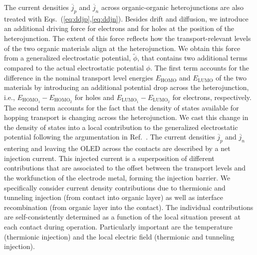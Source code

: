 \documentclass[%
9pt,
 aip,
rsi,%
 amsmath,amssymb,
preprint,%
]{revtex4-1}
\begin{document}
The current densities $\overline{j}_p$ and $\overline{j}_n$ across organic-organic heterojunctions are also treated with Eqs.~(\ref{eq:ddjp},\ref{eq:ddjn}).
%
Besides drift and diffusion, we introduce an additional driving force for electrons and for holes at the position of the heterojunction. 
The extent of this force reflects how the transport-relevant levels of the two organic materials align at the heterojunction.
We obtain this force from a generalized electrostatic potential, $\tilde{\phi}$, that contains two additional terms compared to the actual electrostatic potential $\phi$. 
The first term accounts for the difference in the nominal transport level energies $E_{\mathrm{HOMO}}$ and $E_{\mathrm{LUMO}}$ of the two materials by introducing an additional potential drop across the heterojunction, i.e., $E_{\mathrm{HOMO}_1}-E_{\mathrm{HOMO}_2}$ for holes and $E_{\mathrm{LUMO}_1}-E_{\mathrm{LUMO}_2}$ for electrons, respectively. \cite{Sutherland}
The second term accounts for the fact that the density of states available for hopping transport is changing across the heterojunction.
We cast this change in the density of states into a local contribution to the generalized electrostatic potential following the argumentation in Ref.~\cite{Liemant}.
The current densities $\overline{j}_p$ and $\overline{j}_n$ entering and leaving the OLED across the contacts are described by a net injection current.
This injected current is a superposition of different contributions that are associated to the offset between the transport levels and the workfunction of the electrode metal, forming the injection barrier. We specifically consider current density contributions due to thermionic and tunneling injection (from contact into organic layer) as well as interface recombination (from organic layer into the contact).\cite{Davids1998a,Gruber2012,Scott1999}
The individual contributions are self-consistently determined as a function of the local situation present at each contact during operation. Particularly important are the temperature (thermionic injection) and the local electric field (thermionic and tunneling injection). 
\end{document}
